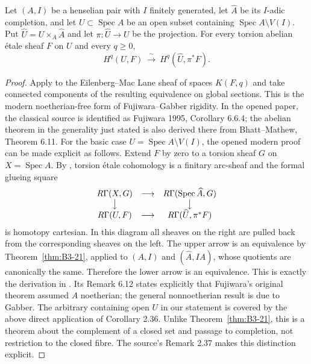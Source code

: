 \begin{theorem}\label{thm:B3-fujiwara}
Let $(A,I)$ be a henselian pair with $I$ finitely generated, let
$\widehat A$ be its $I$-adic completion, and let
$U\subset\operatorname{Spec}A$ be an open subset containing
$\operatorname{Spec}A\setminus V(I)$.
Put $\widehat U=U\times_A\widehat A$ and let
$\pi:\widehat U\to U$ be the projection.
For every torsion abelian \'etale sheaf $F$ on $U$ and every $q\ge0$,
\[
 H^q(U,F)\ \xrightarrow{\ \sim\ }\
 H^q(\widehat U,\pi^*F).
\]
\end{theorem}
\begin{proof}
Apply \cite[Corollary 2.36, with Notation 2.33]{BHaineEtAl2024} to
the Eilenberg--Mac Lane sheaf of spaces $K(F,q)$ and take connected
components of the resulting equivalence on global sections.
This is the modern noetherian-free form of Fujiwara--Gabber rigidity.
In the opened paper, the classical source is identified as Fujiwara
1995, Corollary 6.6.4; the abelian theorem in the generality just stated
is also derived there from Bhatt--Mathew, Theorem 6.11.
For the basic case $U=\operatorname{Spec}A\setminus V(I)$,
the opened modern proof can be made explicit as follows.
Extend $F$ by zero to a torsion sheaf $G$ on $X=\operatorname{Spec}A$.
By \cite[Theorems 5.4 and 6.4, author pp.~38 and 48]{BBhattMathewArc},
torsion \'etale cohomology is a finitary arc-sheaf and the formal
glueing square
\[
\begin{array}{ccc}
R\Gamma(X,G)&\longrightarrow&R\Gamma(\operatorname{Spec}\widehat A,G)\\
\big\downarrow&&\big\downarrow\\
R\Gamma(U,F)&\longrightarrow&R\Gamma(\widehat U,\pi^*F)
\end{array}
\]
is homotopy cartesian. In this diagram all sheaves on the right are
pulled back from the corresponding sheaves on the left.
The upper arrow is an equivalence by Theorem~\ref{thm:B3-21},
applied to $(A,I)$ and $(\widehat A,I\widehat A)$, whose quotients
are canonically the same. Therefore the lower arrow is an
equivalence. This is exactly the derivation in
\cite[Corollary 6.10 and Theorem 6.11, author p.~50]{BBhattMathewArc}.
Its Remark 6.12 states explicitly that Fujiwara's original theorem
assumed $A$ noetherian; the general nonnoetherian result is due
to Gabber. The arbitrary containing open $U$ in our statement is
covered by the above direct application of Corollary 2.36.
Unlike Theorem~\ref{thm:B3-21}, this is a theorem about the complement
of a closed set and passage to completion, not restriction to the
closed fibre. The source's Remark 2.37 makes this distinction explicit.
\end{proof}


